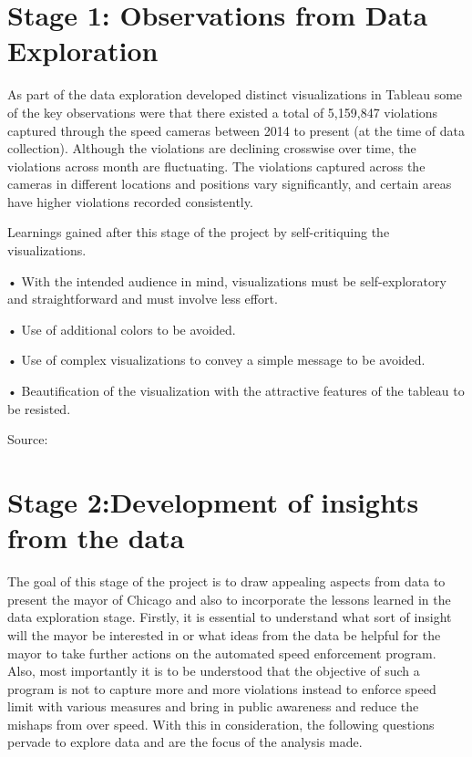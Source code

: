 \documentclass[]{book}
\begin{document}
\hypertarget{stage-1-observations-from-data-exploration}{%
\chapter{Stage 1: Observations from Data Exploration}\label{stage-1-observations-from-data-exploration}}

As part of the data exploration developed distinct visualizations in Tableau some of the key observations were that there existed a total of 5,159,847 violations captured through the speed cameras between 2014 to present (at the time of data collection). Although the violations are declining crosswise over time, the violations across month are fluctuating. The violations captured across the cameras in different locations and positions vary significantly, and certain areas have higher violations recorded consistently.

Learnings gained after this stage of the project by self-critiquing the visualizations.

• With the intended audience in mind, visualizations must be self-exploratory and straightforward and must involve less effort.

• Use of additional colors to be avoided.

• Use of complex visualizations to convey a simple message to be avoided.

• Beautification of the visualization with the attractive features of the tableau to be resisted.

Source: \citep{dataexp}

\hypertarget{stage-2development-of-insights-from-the-data}{%
\chapter{Stage 2:Development of insights from the data}\label{stage-2development-of-insights-from-the-data}}

The goal of this stage of the project is to draw appealing aspects from data to present the mayor of Chicago and also to incorporate the lessons learned in the data exploration stage.
Firstly, it is essential to understand what sort of insight will the mayor be interested in or what ideas from the data be helpful for the mayor to take further actions on the automated speed enforcement program. Also, most importantly it is to be understood that the objective of such a program is not to capture more and more violations instead to enforce speed limit with various measures and bring in public awareness and reduce the mishaps from over speed. With this in consideration, the following questions pervade to explore data and are the focus of the analysis made.
\end{document}
